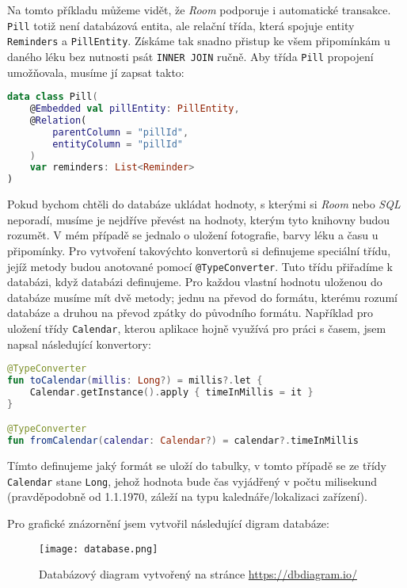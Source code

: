 \documentclass[../TakeYourPill.tex]{subfiles}
\begin{document}
Na tomto příkladu můžeme vidět, že \textit{Room} podporuje i automatické transakce. \texttt{Pill} totiž není databázová entita, ale relační třída, která spojuje entity \texttt{Reminders} a \texttt{PillEntity}. Získáme tak snadno přistup ke všem připomínkám u daného léku bez nutnosti psát \texttt{INNER JOIN} ručně. Aby třída \texttt{Pill} propojení umožňovala, musíme jí zapsat takto:

\setmonofont{JetBrains Mono}
\begin{lstlisting}[language=Kotlin]
data class Pill(
    @Embedded val pillEntity: PillEntity,
    @Relation(
        parentColumn = "pillId",
        entityColumn = "pillId"
    )
    var reminders: List<Reminder>
)
\end{lstlisting}
\setmonofont{Latin Modern Mono}

Pokud bychom chtěli do databáze ukládat hodnoty, s kterými si \textit{Room} nebo \textit{SQL} neporadí, musíme je nejdříve převést na hodnoty, kterým tyto knihovny budou rozumět. V mém případě se jednalo o uložení fotografie, barvy léku a času u připomínky. Pro vytvoření takovýchto konvertorů si definujeme speciální třídu, jejíž metody budou anotované pomocí \texttt{@TypeConverter}. Tuto třídu přiřadíme k databázi, když databázi definujeme. Pro každou vlastní hodnotu uloženou do databáze musíme mít dvě metody; jednu na převod do formátu, kterému rozumí databáze a druhou na převod zpátky do původního formátu. Například pro uložení třídy \texttt{Calendar}, kterou aplikace hojně využívá pro práci s časem, jsem napsal následující konvertory:

\begin{minipage}{\linewidth}
\setmonofont{JetBrains Mono}
\begin{lstlisting}[language=Kotlin]
@TypeConverter
fun toCalendar(millis: Long?) = millis?.let {
    Calendar.getInstance().apply { timeInMillis = it }
}

@TypeConverter
fun fromCalendar(calendar: Calendar?) = calendar?.timeInMillis
\end{lstlisting}
\setmonofont{Latin Modern Mono}
\end{minipage}

Tímto definujeme jaký formát se uloží do tabulky, v tomto případě se ze třídy \texttt{Calendar} stane \texttt{Long}, jehož hodnota bude čas vyjádřený v počtu milisekund (pravděpodobně od 1.1.1970, záleží na typu kalednáře/lokalizaci zařízení). 

Pro grafické znázornění jsem vytvořil následující digram databáze:

\begin{figure}[h]
\centering
\texttt{[image: database.png]}
\caption{Databázový diagram vytvořený na stránce \url{https://dbdiagram.io/}}
\end{figure}
\end{document}
